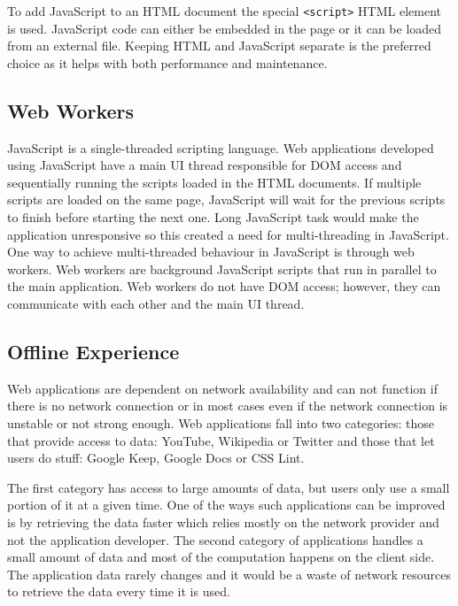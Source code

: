 \documentclass[10pt,a4paper,twoside]{book}
\begin{document}
To add JavaScript to an HTML document the special \texttt{<script>} HTML element is used. JavaScript code can either be embedded in the page or it can be loaded from an external file. Keeping HTML and JavaScript separate is the preferred choice as it helps with both performance and maintenance.


\subsection{Web Workers}

JavaScript is a single-threaded scripting language. Web applications developed using JavaScript have a main UI thread responsible for DOM access and sequentially running the scripts loaded in the HTML documents. If multiple scripts are loaded on the same page, JavaScript will wait for the previous scripts to finish before starting the next one. Long JavaScript task would make the application unresponsive so this created a need for multi-threading in JavaScript. One way to achieve multi-threaded behaviour in JavaScript is through web workers. Web workers are background JavaScript scripts that run in parallel to the main application. Web workers do not have DOM access; however, they can communicate with each other and the main UI thread.

\subsection{Offline Experience}
Web applications are dependent on network availability and can not function if there is no network connection or in most cases even if the network connection is unstable or not strong enough. Web applications fall into two categories: those that provide access to data: YouTube, Wikipedia or Twitter and those that let users do stuff: Google Keep, Google Docs or CSS Lint.

The first category has access to large amounts of data, but users only use a small portion of it at a given time. One of the ways such applications can be improved is by retrieving the data faster which relies mostly on the network provider and not the application developer. The second category of applications handles a small amount of data and most of the computation happens on the client side. 	The application data rarely changes and it would be a waste of network resources to retrieve the data every time it is used. 
\end{document}
